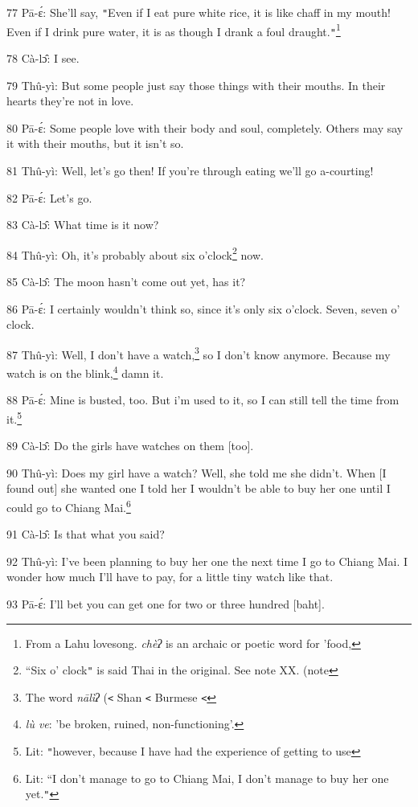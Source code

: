 77 Pā-ɛ́: She'll say, \texttt{"}Even if I eat pure white rice, it is like chaff
in my mouth! Even if I drink pure water, it is as though I drank a foul draught.\texttt{"}\footnote{From a Lahu lovesong. \textit{chèʔ} is an archaic or poetic word for 'food,}

78 Cà-lɔ̂: I see.

79 Thû-yì: But some people just say those things with their mouths. In their
hearts they're not in love.

80 Pā-ɛ́: Some people love with their body and soul, completely. Others may
say it with their mouths, but it isn't so.

81 Thû-yì: Well, let's go then! If you're through eating we'll go a-courting!

82 Pā-ɛ́: Let's go.

83 Cà-lɔ̂: What time is it now?

84 Thû-yì: Oh, it's probably about\textit{ }six o'clock\footnote{``Six o' clock\texttt{"} is said Thai in the original. See note XX. (note} now.

85 Cà-lɔ̂: The moon hasn't come out yet, has it?

86 Pā-ɛ́: I certainly wouldn't think so, since it's only six o'clock. Seven,
seven o' clock.

87 Thû-yì: Well, I don't have a watch,\footnote{The word \textit{nālìʔ }(\texttt{<} Shan \texttt{<} Burmese \texttt{<}} so I don't know anymore. Because my
watch is on the blink,\footnote{\textit{lù ve}: 'be broken, ruined, non-functioning'.} damn it.

88 Pā-ɛ́: Mine is busted, too. But i'm used to it, so I can still tell the
time from it.\footnote{Lit: \texttt{"}however, because I have had the experience of getting to use}

89 Cà-lɔ̂: Do the girls have watches on them [too].

90 Thû-yì: Does my girl have a watch? Well, she told me she didn't. When [I found
out] she wanted one I told her I wouldn't be able to buy her one until I could
go to Chiang Mai.\footnote{Lit: ``I don't manage to go to Chiang Mai, I don't manage to buy her one yet.\texttt{"}}

91 Cà-lɔ̂: Is that what you said?

92 Thû-yì: I've been planning to buy her one the next time I go to Chiang Mai.
I wonder how much I'll have to pay, for a little tiny watch like that.

93 Pā-ɛ́: I'll bet you can get one for two or three hundred [baht].

